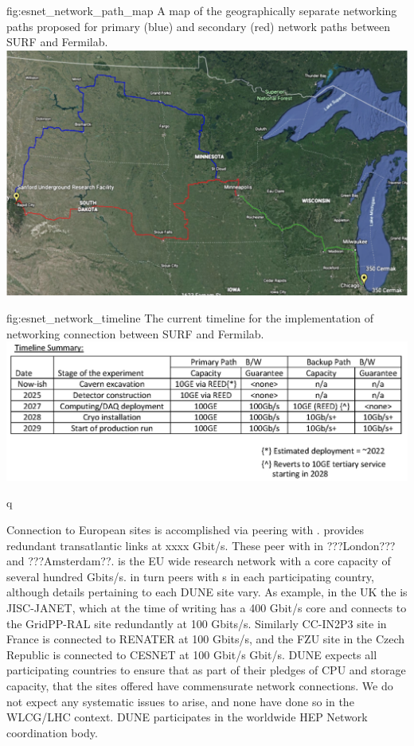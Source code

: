 \documentclass[../main-v1.tex]{subfiles}
\begin{document}
\begin{dunefigure}
{fig:esnet_network_path_map} 
{A map of the geographically separate networking paths proposed for primary (blue) and secondary (red) network paths between SURF and Fermilab.}
\includegraphics[width=0.9\columnwidth]{graphics/Networking/DUNE_ESNet_network_path.png}
\end{dunefigure}

\begin{dunefigure}
{fig:esnet_network_timeline} 
{The current timeline for the implementation of networking connection between SURF and Fermilab.}
\includegraphics[width=0.9\columnwidth]{graphics/Networking/networking_timeline.png}
\end{dunefigure}

 q

Connection to European sites is accomplished via  peering with .  
 provides redundant transatlantic links at xxxx Gbit/s. These peer with  in ???London??? and ???Amsterdam??.
 is the EU wide research network with a core capacity of several hundred Gbits/s.  in turn peers with s  in each participating country, although details pertaining to each DUNE site vary. As example, in the UK the  is JISC-JANET, which at the time of writing has a 400 Gbit/s core and connects to the GridPP-RAL site redundantly at 100 Gbits/s. 
Similarly CC-IN2P3 site in France is connected to RENATER at 100 Gbits/s, and the FZU site in the Czech Republic is connected to CESNET at 100 Gbit/s Gbit/s.  DUNE expects all participating countries to ensure that as part of their pledges of CPU and storage capacity, that the sites offered have commensurate network connections. We do not expect any systematic issues to arise, and none have done so in the WLCG/LHC context. DUNE participates in the worldwide HEP Network coordination body.
\end{document}
